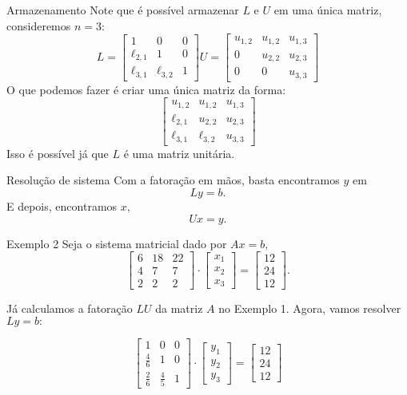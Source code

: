 \documentclass[]{beamer}
\begin{document}
\begin{frame}{Armazenamento}
Note que é possível armazenar $L$ e $U$ em uma única matriz, consideremos $n =3:$
$$L=\begin{bmatrix}1&0&0\\ \ell_{2,1}&1&0\\ \ell_{3,1}&\ell_{3,2}&1\end{bmatrix} U = \begin{bmatrix}u_{1,2}&u_{1,2}&u_{1,3}\\ 0&u_{2,2}&u_{2,3}\\ 0&0&u_{3,3}\end{bmatrix}$$ 
O que podemos fazer é criar uma única matriz da forma:
$$\begin{bmatrix}u_{1,2}&u_{1,2}&u_{1,3}\\ \ell_{2,1}&u_{2,2}&u_{2,3}\\ \ell_{3,1}&\ell_{3,2}&u_{3,3}\end{bmatrix}$$ 
Isso é possível já que $L$ é uma matriz unitária.
\end{frame}



\begin{frame}{Resolução de sistema}
	Com a fatoração em mãos, basta encontramos $y$ em
	$$Ly=b. $$
	E depois, encontramos $x,$
	$$ Ux=y.$$
\end{frame}

\begin{frame}{Exemplo 2}
Seja o sistema matricial dado por $Ax=b,$
$$\begin{bmatrix}6&18&22\\ 4&7&7\\ 2&2&2\end{bmatrix}\cdot \begin{bmatrix}x_1\\ x_2\\ x_3\end{bmatrix}=\begin{bmatrix}12\\ 24\\ 12\end{bmatrix}.$$

Já calculamos a fatoração $LU$ da matriz $A$ no Exemplo 1. Agora, vamos resolver $Ly=b:$

$$\begin{bmatrix}1&0&0\\ \frac{4}{6}&1&0\\ \frac{2}{6}&\frac{4}{5}&1\end{bmatrix}\cdot \begin{bmatrix}y_1\\ y_2\\ y_3\end{bmatrix}=\begin{bmatrix}12\\ 24\\ 12\end{bmatrix}$$

\end{frame}
\end{document}
